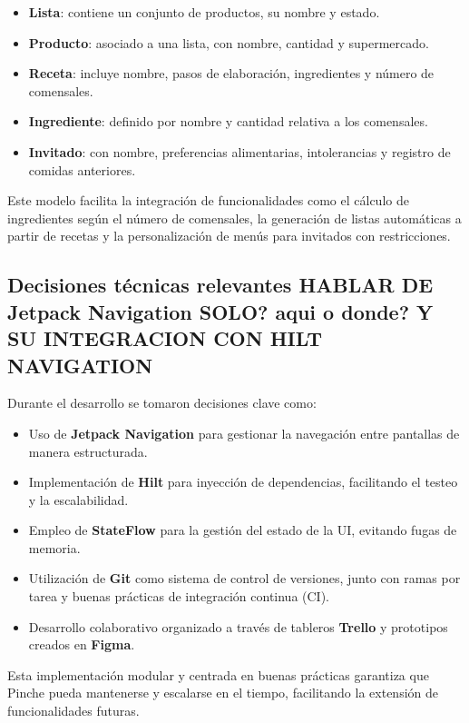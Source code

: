 \begin{itemize}
    \item \textbf{Lista}: contiene un conjunto de productos, su nombre y estado.
    \item \textbf{Producto}: asociado a una lista, con nombre, cantidad y supermercado.
    \item \textbf{Receta}: incluye nombre, pasos de elaboración, ingredientes y número de comensales.
    \item \textbf{Ingrediente}: definido por nombre y cantidad relativa a los comensales.
    \item \textbf{Invitado}: con nombre, preferencias alimentarias, intolerancias y registro de comidas anteriores.
\end{itemize}

Este modelo facilita la integración de funcionalidades como el cálculo de ingredientes según el número de comensales, la generación de listas automáticas a partir de recetas y la personalización de menús para invitados con restricciones.


\subsection{Decisiones técnicas relevantes HABLAR DE Jetpack Navigation SOLO? aqui o donde? Y SU INTEGRACION CON HILT NAVIGATION}

Durante el desarrollo se tomaron decisiones clave como:

\begin{itemize}
    \item Uso de \textbf{Jetpack Navigation} para gestionar la navegación entre pantallas de manera estructurada.
    \item Implementación de \textbf{Hilt} para inyección de dependencias, facilitando el testeo y la escalabilidad.
    \item Empleo de \textbf{StateFlow} para la gestión del estado de la UI, evitando fugas de memoria.
    \item Utilización de \textbf{Git} como sistema de control de versiones, junto con ramas por tarea y buenas prácticas de integración continua (CI).
    \item Desarrollo colaborativo organizado a través de tableros \textbf{Trello} y prototipos creados en \textbf{Figma}.
\end{itemize}

Esta implementación modular y centrada en buenas prácticas garantiza que Pinche pueda mantenerse y escalarse en el tiempo, facilitando la extensi\'on de funcionalidades futuras.

